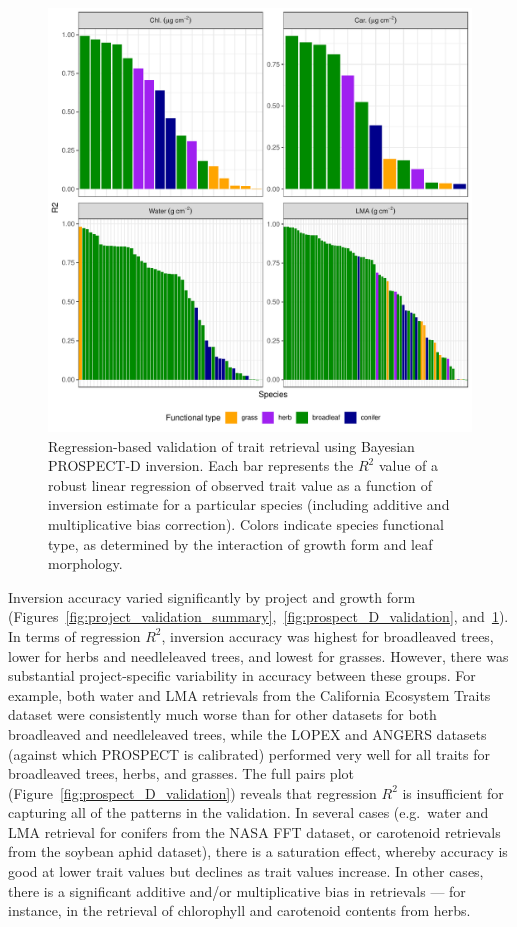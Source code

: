 \begin{figure}
  \centering
  \includegraphics[width=\textwidth]{3_prospect/figures/r2_by_gf.pdf}
  \caption{%
    Regression-based validation of trait retrieval using Bayesian PROSPECT-D inversion.
    Each bar represents the $R^2$ value of a robust linear regression of observed trait value as a function of inversion estimate for a particular species (including additive and multiplicative bias correction).
    Colors indicate species functional type, as determined by the interaction of growth form and leaf morphology.
  }\label{fig:prospect_D_r2}
\end{figure}

Inversion accuracy varied significantly by project and growth form (Figures~\ref{fig:project_validation_summary},~\ref{fig:prospect_D_validation}, and~\ref{fig:prospect_D_r2}).
In terms of regression $R^2$, inversion accuracy was highest for broadleaved trees, lower for herbs and needleleaved trees, and lowest for grasses.
However, there was substantial project-specific variability in accuracy between these groups.
For example, both water and LMA retrievals from the California Ecosystem Traits dataset were consistently much worse than for other datasets for both broadleaved and needleleaved trees, while the LOPEX and ANGERS datasets (against which PROSPECT is calibrated) performed very well for all traits for broadleaved trees, herbs, and grasses.
The full pairs plot (Figure~\ref{fig:prospect_D_validation}) reveals that regression $R^2$ is insufficient for capturing all of the patterns in the validation.
In several cases (e.g.\ water and LMA retrieval for conifers from the NASA FFT dataset, or carotenoid retrievals from the soybean aphid dataset), there is a saturation effect, whereby accuracy is good at lower trait values but declines as trait values increase.
In other cases, there is a significant additive and/or multiplicative bias in retrievals --- for instance, in the retrieval of chlorophyll and carotenoid contents from herbs.

